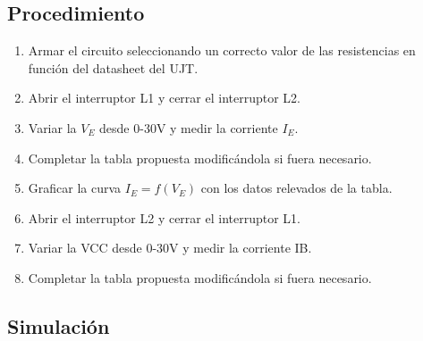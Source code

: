 \subsection{Procedimiento}
\begin{enumerate}
  \item Armar el circuito seleccionando un correcto valor de las resistencias en
    función del datasheet del UJT.
  \item Abrir el interruptor L1 y cerrar el interruptor L2.
  \item Variar la $V_E$ desde 0-30V y medir la corriente $I_E$.
  \item Completar la tabla propuesta modificándola si fuera necesario.
  \item Graficar la curva $I_E= f(V_E)$ con los datos relevados de la tabla.
  \item Abrir el interruptor L2 y cerrar el interruptor L1.
  \item Variar la VCC desde 0-30V y medir la corriente IB.
  \item Completar la tabla propuesta modificándola si fuera necesario.
\end{enumerate}
\subsection{Simulación}
